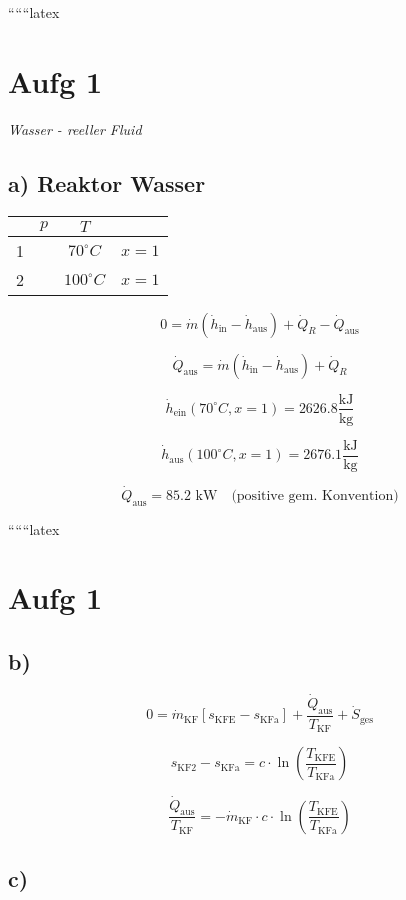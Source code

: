 
``````latex


\section*{Aufg 1}
\textit{Wasser - reeller Fluid}

\subsection*{a) Reaktor Wasser}

\begin{tabular}{|c|c|c|c|}
\hline
 & $p$ & $T$ & \\
\hline
1 &  & $70^\circ C$ & $x=1$ \\
\hline
2 &  & $100^\circ C$ & $x=1$ \\
\hline
\end{tabular}

\[
0 = \dot{m} (\dot{h}_{\text{in}} - \dot{h}_{\text{aus}}) + \dot{Q}_R - \dot{Q}_{\text{aus}}
\]

\[
\dot{Q}_{\text{aus}} = \dot{m} (\dot{h}_{\text{in}} - \dot{h}_{\text{aus}}) + \dot{Q}_R
\]

\[
\dot{h}_{\text{ein}} (70^\circ C, x=1) = 2626.8 \frac{\text{kJ}}{\text{kg}}
\]

\[
\dot{h}_{\text{aus}} (100^\circ C, x=1) = 2676.1 \frac{\text{kJ}}{\text{kg}}
\]

\[
\dot{Q}_{\text{aus}} = 85.2 \text{ kW} \quad \text{(positive gem. Konvention)}
\]

``````latex


\section*{Aufg 1}

\subsection*{b)}

\[
0 = \dot{m}_{\text{KF}} \left[ s_{\text{KFE}} - s_{\text{KFa}} \right] + \frac{\dot{Q}_{\text{aus}}}{T_{\text{KF}}} + \dot{S}_{\text{ges}}
\]

\[
s_{\text{KF2}} - s_{\text{KFa}} = c \cdot \ln \left( \frac{T_{\text{KFE}}}{T_{\text{KFa}}} \right)
\]

\[
\frac{\dot{Q}_{\text{aus}}}{T_{\text{KF}}} = -\dot{m}_{\text{KF}} \cdot c \cdot \ln \left( \frac{T_{\text{KFE}}}{T_{\text{KFa}}} \right)
\]

\subsection*{c)}

